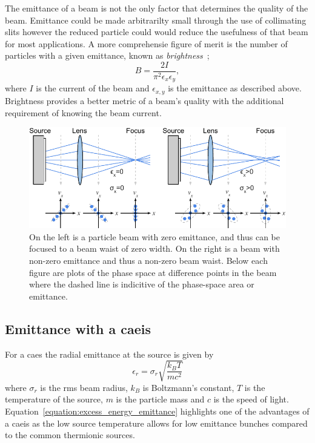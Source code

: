 The emittance of a beam is not the only factor that determines the quality of the beam.
Emittance could be made arbitrarilty small through the use of collimating slits however the reduced particle could would reduce the usefulness of that beam for most applications.
A more comprehensie figure of merit is the number of particles with a given emittance, known as \emph{brightness}~\cite{reiser_theory_2008};
\begin{equation}
B = \frac{2I}{\pi^2\epsilon_x\epsilon_y},
\end{equation}
where $I$ is the current of the beam and $\epsilon_{x,y}$ is the emittance as described above.
Brightness provides a better metric of a beam's quality with the additional requirement of knowing the beam current.

\begin{figure}
\center
\includegraphics{part2/Figs/EmittanceFocasability.pdf}
\caption{On the left is a particle beam with zero emittance, and thus can be focused to a beam waist of zero width. On the right is a beam with non-zero emittance and thus a non-zero beam waist. Below each figure are plots of the phase space at difference points in the beam where the dashed line is indicitive of the phase-space area or emittance.}
\label{figure:focusability}
\end{figure}

\subsection{Emittance with a \gls{caeis}}
\label{section:excess_energy_emittance}

For a \gls{caes} the radial emittance at the source is given by~\cite{mcculloch_high-coherence_2013}
\begin{equation}\label{equation:excess_energy_emittance}
\epsilon_r = \sigma_r \sqrt{\frac{k_B T}{m c^2}}
\end{equation}
where $\sigma_r$ is the \gls{rms} beam radius, $k_B$ is Boltzmann's constant, $T$ is the temperature of the source, $m$ is the particle mass and $c$ is the speed of light.
Equation~\ref{equation:excess_energy_emittance} highlights one of the advantages of a \gls{caeis} as the low source temperature allows for low emittance bunches compared to the common thermionic sources.


